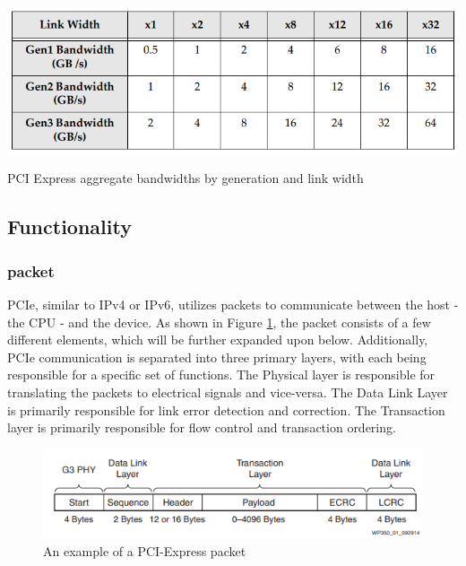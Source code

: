 \begin{table}
\includegraphics[width = \linewidth]{figures/PCIE-bandwidths}
\caption{PCI Express aggregate bandwidths by generation and link width ~\parencite{jackson_pci_2012}}
\label{tab:bandwidths}
\end{table}

\subsection{Functionality}

\subsubsection{packet}
PCIe, similar to IPv4 or IPv6, utilizes packets to communicate between the host - the CPU - and the device. As shown in Figure \ref{fig:packet}, the packet consists of a few different elements, which will be further expanded upon below. Additionally, PCIe communication is separated into three primary layers, with each being responsible for a specific set of functions. The Physical layer is responsible for translating the packets to electrical signals and vice-versa. The Data Link Layer is primarily responsible for link error detection and correction. The Transaction layer is primarily responsible for flow control and transaction ordering. \cite{lawley_understanding_2014}

\begin{figure}
\includegraphics[width = \linewidth]{figures/PCIE-packet}
\caption{An example of a PCI-Express packet ~\parencite{lawley_understanding_2014}}
\label{fig:packet}
\end{figure}

